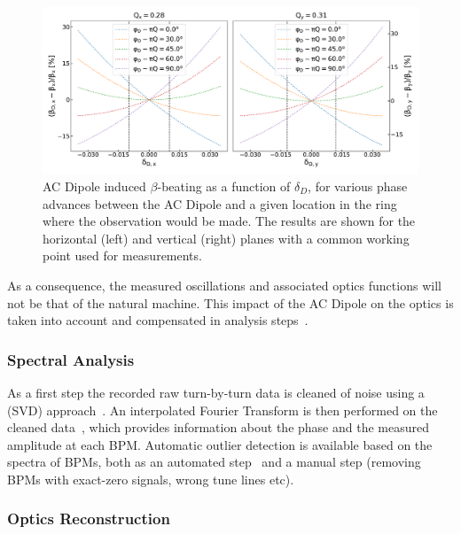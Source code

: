 \begin{figure}[!htb]
  \centering
  \includegraphics*[width=0.99\linewidth]{Figures/Optics_Measurements_Corrections_at_LHC/bbeatings_acdipole.pdf}
  \caption{AC Dipole induced \(\beta\)-beating as a function of \(\delta_D\), for various phase advances between the AC Dipole and a given location in the ring where the observation would be made. The results are shown for the horizontal (left) and vertical (right) planes with a common working point used for measurements.}
  \label{figure:ac_dipole_induced_beta_beating}
\end{figure}

As a consequence, the measured oscillations and associated optics functions will not be that of the natural machine.
This impact of the AC Dipole on the optics is taken into account and compensated in analysis steps~\cite{IPAC:Miyamoto:Measurement_Coupling_RDTs_LHC_AC_Dipole}.

\subsubsection*{Spectral Analysis}

As a first step the recorded raw turn-by-turn data is cleaned of noise using a  (SVD) approach~\cite{PRAB:Calaga:Statistical_Analysis_RHIC_BPMs}.
An interpolated Fourier Transform is then performed on the cleaned data~\cite{PHD:Malina,IPAC:Malina:Harpy_Fast_Simple}, which provides information about the phase and the measured amplitude at each BPM.
Automatic outlier detection is available based on the spectra of BPMs, both as an automated step~\cite{PRAB:Fol:Detection_Faulty_BPMs} and a manual step (removing BPMs with exact-zero signals, wrong tune lines etc).

\subsubsection*{Optics Reconstruction}

